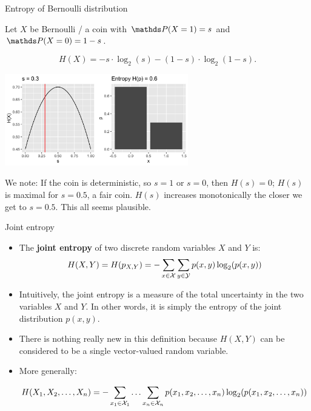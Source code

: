 \documentclass[11pt,compress,t,notes=noshow, xcolor=table]{beamer}
\begin{document}
\begin{vbframe}{Entropy of Bernoulli distribution}

Let $X$ be Bernoulli / a coin with $\P(X=1) = s$ and $\P(X=0) = 1 - s$.

$$ H(X)= -s \cdot \log_2(s)-(1-s)\cdot \log_2(1-s). $$

\begin{center}
\includegraphics[width = 8.0cm ]{figure/entropy_bernoulli.png} \\
\end{center}

We note: If the coin is deterministic, so $s=1$ or $s=0$, then $H(s)=0$; 
$H(s)$ is maximal for $s = 0.5$, a fair coin. 
$H(s)$ increases monotonically the closer we get to $s=0.5$.
This all seems plausible.

\end{vbframe}

\begin{vbframe} {Joint entropy}
\begin{itemize}
  \item The \textbf{joint entropy} of two discrete random variables $X$ and $Y$ is:
    $$ H(X,Y) = H(p_{X,Y}) = - \sum_{x \in \mathcal{X}} \sum_{y \in \mathcal{Y}}  p(x,y) \log_2(p(x,y))$$
  \item Intuitively, the joint entropy is a measure of the total uncertainty in the two variables $X$ and $Y$. In other words, it is simply the entropy of the joint distribution $p(x,y)$.
  \item There is nothing really new in this definition because $H(X, Y)$ can be considered to be a single vector-valued random variable.
  \item More generally:
    \begin{footnotesize}  
  $$ H(X_1, X_2, \ldots, X_n) = - \sum_{x_1 \in \mathcal{X}_1} \ldots \sum_{x_n \in \mathcal{X}_n} p(x_1,x_2, \ldots, x_n) \log_2(p(x_1,x_2, \ldots, x_n)) $$ 
    \end{footnotesize}  
\end{itemize}
\end{vbframe}
\end{document}
